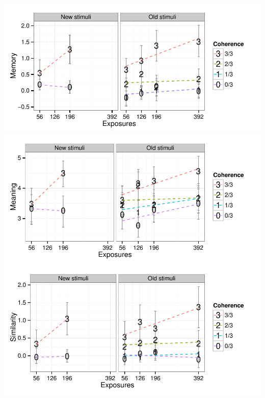 \documentclass[man,floatsintext]{apa6}
\begin{document}
\begin{center}
\includegraphics[width=0.7\linewidth]{stim-comparison-mem} \\

\includegraphics[width=0.7\linewidth]{stim-comparison-mng} \\

\includegraphics[width=0.7\linewidth]{stim-comparison-sim}

\end{center}


\end{document}
